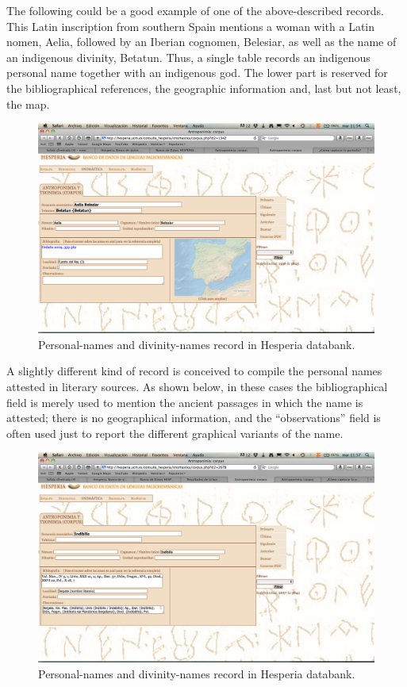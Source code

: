 \documentclass[amsthm,ebook]{saparticle}
\begin{document}
The following could be a good example of one of the above-described records. This Latin inscription from southern Spain
mentions a woman with a Latin nomen, Aelia, followed by an Iberian cognomen, Belesiar, as well as the name of an
indigenous divinity, Betatun. Thus, a single table records an indigenous personal name together with an indigenous god.
The lower part is reserved for the bibliographical references, the geographic information and, last but not least, the
map.

\begin{figure}[!bp]
\centering
 \includegraphics[width=\columnwidth]{EpigraphyandonomasticsinHesperiadatabanktemplate-img003.png}
\caption{Personal-names and divinity-names record in Hesperia databank.}
\label{fig:3}
\end{figure}

A slightly different kind of record is conceived to compile the personal names attested in literary sources. As shown
below, in these cases the bibliographical field is merely used to mention the ancient passages in which the name is
attested; there is no geographical information, and the “observations” field is often used just to report the different
graphical variants of the name.

\begin{figure}[!bp]
\centering
 \includegraphics[width=\columnwidth]{EpigraphyandonomasticsinHesperiadatabanktemplate-img004.png}
\caption{Personal-names and divinity-names record in Hesperia databank.}
\label{fig:4}
\end{figure}
\end{document}
